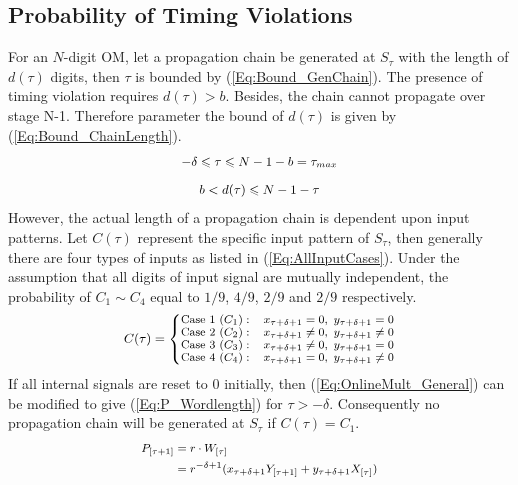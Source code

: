 \documentclass{acm_proc_article-sp}
\begin{document}
\subsection{Probability of Timing Violations}
For an $N$-digit OM, let a propagation chain be generated at $S_{\tau}$ with the length of $d(\tau)$ digits, then $\tau$ is bounded by (\ref{Eq:Bound_GenChain}). The presence of timing violation requires $d(\tau)>b$. Besides, the chain cannot propagate over stage N-1. Therefore parameter the bound of $d(\tau)$ is given by (\ref{Eq:Bound_ChainLength}).
%
\begin{eqnarray}\label{Eq:Bound_GenChain}
\small
  -\delta\leqslant\tau\leqslant N-1-b=\tau_{max}
\end{eqnarray}
%
\vspace{-4ex}
\begin{eqnarray}\label{Eq:Bound_ChainLength}
  b<d(\tau)\leqslant N-1-\tau
\normalsize
\end{eqnarray}
%
However, the actual length of a propagation chain is dependent upon input patterns. Let $C(\tau)$ represent the specific input pattern of $S_{\tau}$, then generally there are four types of inputs as listed in (\ref{Eq:AllInputCases}). Under the assumption that all digits of input signal are mutually independent, the probability of $C_1\sim C_4$ equal to $1/9$, $4/9$, $2/9$ and $2/9$ respectively.
%
\begin{eqnarray}\label{Eq:AllInputCases}
\small
  C(\tau)=\left\{\begin{matrix}
    \text{Case 1~(}C_1{):} & x_{\tau+\delta+1}=0,~y_{\tau+\delta+1}=0\\
    \text{Case 2~(}C_2{):} & x_{\tau+\delta+1}\neq0,~y_{\tau+\delta+1}\neq0\\
    \text{Case 3~(}C_3{):} & x_{\tau+\delta+1}\neq0,~y_{\tau+\delta+1}=0\\
    \text{Case 4~(}C_4{):} & x_{\tau+\delta+1}=0,~y_{\tau+\delta+1}\neq0
  \end{matrix}\right.
\normalsize
\end{eqnarray}
%
If all internal signals are reset to 0 initially, then (\ref{Eq:OnlineMult_General}) can be modified to give (\ref{Eq:P_Wordlength}) for $\tau>-\delta$. Consequently no propagation chain will be generated at $S_{\tau}$ if $C(\tau)=C_1$.
%
\begin{eqnarray}\label{Eq:P_Wordlength}
\small
  \begin{aligned}
    P_{[\tau+1]} &= r\cdot W_{[\tau]}\\
                 &= r^{-\delta+1}(x_{\tau+\delta+1}Y_{[\tau+1]}+y_{\tau+\delta+1}X_{[\tau]})\\
  \end{aligned}
\normalsize
\end{eqnarray}
\end{document}
